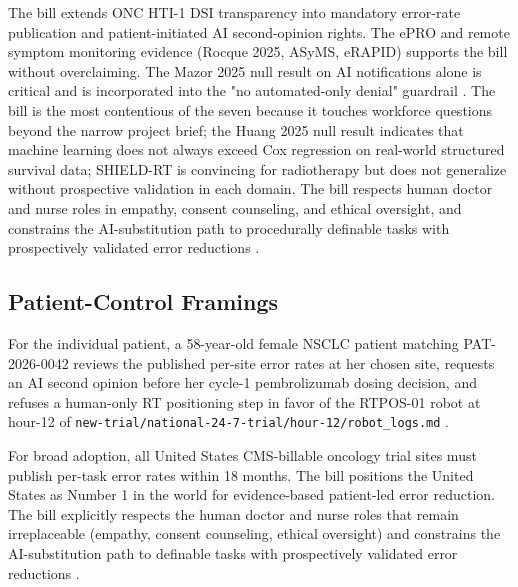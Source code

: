 \hspace{0.5cm} The bill extends ONC HTI-1 DSI transparency into mandatory error-rate publication and patient-initiated AI second-opinion rights. The
ePRO and remote symptom monitoring evidence (Rocque 2025, ASyMS,
eRAPID) supports the bill without overclaiming. The Mazor 2025 null
result on AI notifications alone is critical and is incorporated
into the "no automated-only denial" guardrail
\cite{rank9_onc_hti1_2023, rocque2025remote_symptom_monitoring,
kearney2009asyms, maguire2017esmart, absolom2021erapid,
mazor2025ai_notifications_trial}. The bill is the most contentious
of the seven because it touches workforce questions beyond the
narrow project brief; the Huang 2025 null result indicates that
machine learning does not always exceed Cox regression on real-world structured survival data; SHIELD-RT is convincing for
radiotherapy but does not generalize without prospective validation
in each domain. The bill respects human doctor and nurse roles in
empathy, consent counseling, and ethical oversight, and constrains
the AI-substitution path to procedurally definable tasks with
prospectively validated error reductions \cite{kawchak_2026_19994945,
kawchak_2026_19119939}.

\subsection{Patient-Control Framings}

\hspace{0.5cm} For the individual patient, a 58-year-old female NSCLC patient
matching PAT-2026-0042 reviews the published per-site error rates
at her chosen site, requests an AI second opinion before her cycle-1
pembrolizumab dosing decision, and refuses a human-only RT
positioning step in favor of the RTPOS-01 robot at hour-12
of \texttt{new-trial/national-24-7-trial/hour-12/robot\_logs.md}
\cite{kawchak_2026_19994945, kawchak_2026_19119939}.

For broad adoption, all United States CMS-billable oncology trial
sites must publish per-task error rates within 18 months. The bill
positions the United States as Number 1 in the world for evidence-based patient-led error reduction. The bill explicitly respects the
human doctor and nurse roles that remain irreplaceable (empathy,
consent counseling, ethical oversight) and constrains the AI-substitution path to definable tasks with prospectively
validated error reductions \cite{kawchak_2026_19994945,
kawchak_2026_19119939}.
